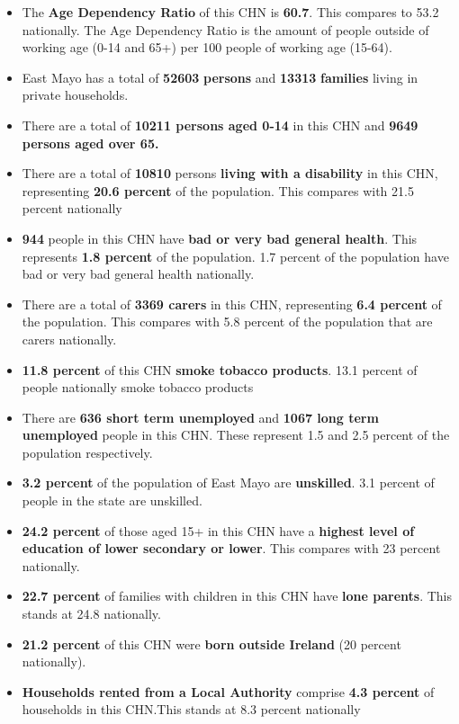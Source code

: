 \documentclass{article}
\begin{document}
\begin{itemize}

\item The \textbf{Age Dependency Ratio} of this CHN is  \textbf{60.7}. This compares to 53.2 nationally. The Age Dependency Ratio is the amount of people outside of working age (0-14 and 65+) per 100 people of working age (15-64). 

\item East Mayo has a total of \textbf{\num{52603}} \textbf{persons} and  \textbf{\num{13313}} \textbf{families} living in private households.

\item There are a total of \textbf{\num{10211} persons aged 0-14} in this CHN and \textbf{\num{9649} persons aged over 65.} 

\item There are a total of \textbf{\num{10810}} persons \textbf{living with a disability} in this CHN, representing \textbf{20.6 percent} of the population. This compares with  21.5 percent nationally

\item \textbf{\num{944}} people in this CHN have \textbf{bad or very bad general health}. This represents \textbf{1.8 percent} of the population. 1.7 percent of the population have bad or very bad general health nationally. 

\item There are a total of \textbf{\num{3369} carers} in this CHN, representing \textbf{6.4 percent} of the population. This compares with 5.8 percent of the population that are carers nationally. 

\item \textbf{11.8 percent} of this CHN \textbf{smoke tobacco products}. 13.1 percent of people nationally smoke tobacco products

\item There are \textbf{\num{636} short term unemployed} and \textbf{\num{1067} long term unemployed} people in this CHN. These represent 1.5 and 2.5 percent of the population respectively.

\item  \textbf{3.2 percent} of the population of East Mayo are \textbf{unskilled}. 3.1 percent of people in the state are unskilled.

\item \textbf{24.2 percent} of those aged 15+ in this CHN have a \textbf{highest level of education of lower secondary or lower}. This compares with 23 percent nationally. 

\item \textbf{22.7 percent} of families with children in this CHN have \textbf{lone parents}. This stands at 24.8 nationally.

\item \textbf{21.2 percent} of this CHN were \textbf{born outside Ireland} (20 percent nationally).

\item \textbf{Households rented from a Local Authority} comprise \textbf{4.3 percent} of households in this CHN.This stands at 8.3 percent nationally

\end{itemize}
\end{document}
